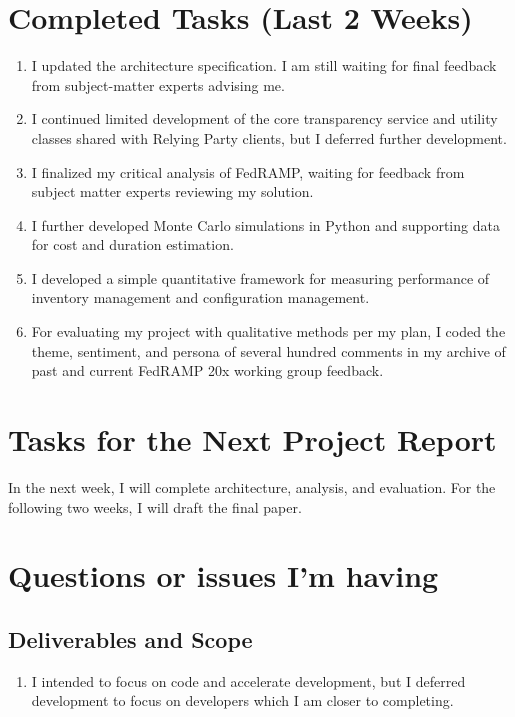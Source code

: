\documentclass{jdf}
\begin{document}
\section*{Completed Tasks (Last 2 Weeks)}

\begin{enumerate}
    \item I updated the architecture specification. I am still waiting for final feedback from subject-matter experts advising me.
    \item I continued limited development of the core transparency service and utility classes shared with Relying Party clients, but I deferred further development.
    \item I finalized my critical analysis of FedRAMP, waiting for feedback from subject matter experts reviewing my solution.
    \item I further developed Monte Carlo simulations in Python and supporting data for cost and duration estimation.
    \item I developed a simple quantitative framework for measuring performance of inventory management and configuration management.
    \item For evaluating my project with qualitative methods per my plan, I coded the theme, sentiment, and persona of several hundred comments in my archive of past and current FedRAMP 20x working group feedback.
\end{enumerate}

\section*{Tasks for the Next Project Report}

In the next week, I will complete architecture, analysis, and evaluation. For the following two weeks, I will draft the final paper.

\section*{Questions or issues I'm having}

\subsection*{Deliverables and Scope}

\begin{enumerate}
    \item I intended to focus on code and accelerate development, but I deferred development to focus on developers which I am closer to completing. 
\end{enumerate}
\end{document}
